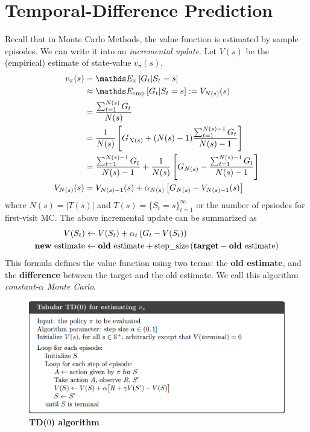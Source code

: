 \documentclass[11pt]{article}
\begin{document}
\section{Temporal-Difference Prediction}
Recall that in Monte Carlo Methods, the value function is estimated by sample episodes. We can write it into an \emph{incremental update}. Let $V(s)$ be the (empirical) estimate of state-value $v_{\pi}(s)$,  
\begin{align*}
v_{\pi}(s) &= \E{\pi}{G_{t} | S_{t} = s} \\
&\approx \E{\text{emp}}{G_{t} | S_{t} = s} := V_{N(s)}(s)  \\
&= \frac{\sum_{t=1}^{N(s)} G_{t}}{N(s)}\, \\
&= \frac{1}{N(s)}\brac{G_{N(s)} + (N(s)-1)\frac{\sum_{t=1}^{N(s)-1} G_{t}}{N(s)-1}} \\
&= \frac{\sum_{t=1}^{N(s)-1} G_{t}}{N(s)-1} + \frac{1}{N(s)}\brac{G_{N(s)} -  \frac{\sum_{t=1}^{N(s)-1} G_{t}}{N(s)-1}} \\
V_{N(s)}(s)&= V_{N(s)-1}(s) + \alpha_{N(s)}\brac{G_{N(s)} -  V_{N(s)-1}(s) }
\end{align*} where $N(s) = |T(s)|$ and $T(s) = \{S_{t}=s\}_{t=1}^{\infty}$ or the number of epsiodes for first-visit MC. The above incremental update can be summarized as \begin{align}
V(S_{t}) &\leftarrow V(S_{t}) + \alpha_{t}\left(G_{t} - V(S_{t})\right) \label{eqn: incremental_update}\\
\text{\textbf{new} estimate}&\leftarrow \text{\textbf{old} estimate} + \text{step\_size}\left(\text{\textbf{target}} - \text{\textbf{old} estimate}\right) \nonumber
\end{align} This formula defines the value function using two terms: the \textbf{old estimate}, and the \textbf{difference} between the target and the old estimate. We call this algorithm\emph{ constant-$\alpha$ Monte Carlo}. 

\begin{figure}
\begin{minipage}[t]{1\linewidth}
  \centering
  \centerline{\includegraphics[scale = 0.3]{TD_0_algo.png}}
\end{minipage}
\caption{\footnotesize{\textbf{TD($0$) algorithm}}}
\label{fig: TD_0_algo}
\end{figure}
\end{document}
